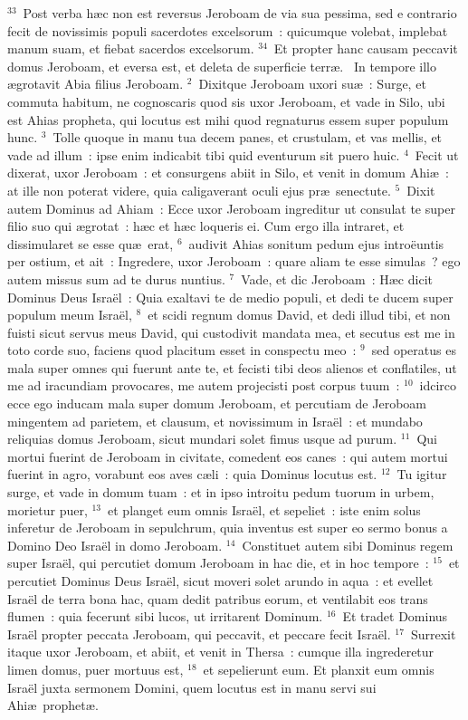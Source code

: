 ${}^{33}$~Post verba h\ae c non est reversus Jeroboam de via sua pessima, sed e contrario fecit de novissimis populi sacerdotes excelsorum~: quicumque volebat, implebat manum suam, et fiebat sacerdos excelsorum.
${}^{34}$~Et propter hanc causam peccavit domus Jeroboam, et eversa est, et deleta de superficie terr\ae .
~In tempore illo \ae grotavit Abia filius Jeroboam.
${}^{2}$~Dixitque Jeroboam uxori su\ae~: Surge, et commuta habitum, ne cognoscaris quod sis uxor Jeroboam, et vade in Silo, ubi est Ahias propheta, qui locutus est mihi quod regnaturus essem super populum hunc.
${}^{3}$~Tolle quoque in manu tua decem panes, et crustulam, et vas mellis, et vade ad illum~: ipse enim indicabit tibi quid eventurum sit puero huic.
${}^{4}$~Fecit ut dixerat, uxor Jeroboam~: et consurgens abiit in Silo, et venit in domum Ahi\ae~: at ille non poterat videre, quia caligaverant oculi ejus pr\ae\ senectute.
${}^{5}$~Dixit autem Dominus ad Ahiam~: Ecce uxor Jeroboam ingreditur ut consulat te super filio suo qui \ae grotat~: h\ae c et h\ae c loqueris ei. Cum ergo illa intraret, et dissimularet se esse qu\ae\ erat,
${}^{6}$~audivit Ahias sonitum pedum ejus intro\"euntis per ostium, et ait~: Ingredere, uxor Jeroboam~: quare aliam te esse simulas~? ego autem missus sum ad te durus nuntius.
${}^{7}$~Vade, et dic Jeroboam~: H\ae c dicit Dominus Deus Isra\"el~: Quia exaltavi te de medio populi, et dedi te ducem super populum meum Isra\"el,
${}^{8}$~et scidi regnum domus David, et dedi illud tibi, et non fuisti sicut servus meus David, qui custodivit mandata mea, et secutus est me in toto corde suo, faciens quod placitum esset in conspectu meo~:
${}^{9}$~sed operatus es mala super omnes qui fuerunt ante te, et fecisti tibi deos alienos et conflatiles, ut me ad iracundiam provocares, me autem projecisti post corpus tuum~:
${}^{10}$~idcirco ecce ego inducam mala super domum Jeroboam, et percutiam de Jeroboam mingentem ad parietem, et clausum, et novissimum in Isra\"el~: et mundabo reliquias domus Jeroboam, sicut mundari solet fimus usque ad purum.
${}^{11}$~Qui mortui fuerint de Jeroboam in civitate, comedent eos canes~: qui autem mortui fuerint in agro, vorabunt eos aves c\ae li~: quia Dominus locutus est.
${}^{12}$~Tu igitur surge, et vade in domum tuam~: et in ipso introitu pedum tuorum in urbem, morietur puer,
${}^{13}$~et planget eum omnis Isra\"el, et sepeliet~: iste enim solus inferetur de Jeroboam in sepulchrum, quia inventus est super eo sermo bonus a Domino Deo Isra\"el in domo Jeroboam.
${}^{14}$~Constituet autem sibi Dominus regem super Isra\"el, qui percutiet domum Jeroboam in hac die, et in hoc tempore~:
${}^{15}$~et percutiet Dominus Deus Isra\"el, sicut moveri solet arundo in aqua~: et evellet Isra\"el de terra bona hac, quam dedit patribus eorum, et ventilabit eos trans flumen~: quia fecerunt sibi lucos, ut irritarent Dominum.
${}^{16}$~Et tradet Dominus Isra\"el propter peccata Jeroboam, qui peccavit, et peccare fecit Isra\"el.
${}^{17}$~Surrexit itaque uxor Jeroboam, et abiit, et venit in Thersa~: cumque illa ingrederetur limen domus, puer mortuus est,
${}^{18}$~et sepelierunt eum. Et planxit eum omnis Isra\"el juxta sermonem Domini, quem locutus est in manu servi sui Ahi\ae\ prophet\ae .


